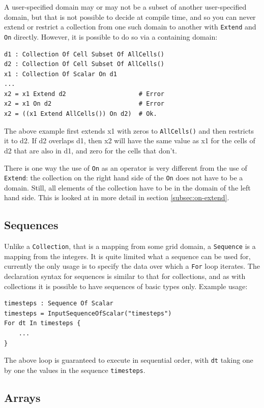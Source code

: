 \documentclass[11pt]{article}
\newcommand{\code}[1]{\texttt{#1}}
\begin{document}
A user-specified domain may or may not be a subset of another user-specified domain, but
that is not possible to decide at compile time, and so you can never extend or restrict a
collection from one such domain to another with \code{Extend} and \code{On}
directly. However, it is possible to do so via a containing domain:

\begin{verbatim}
d1 : Collection Of Cell Subset Of AllCells()
d2 : Collection Of Cell Subset Of AllCells()
x1 : Collection Of Scalar On d1
...
x2 = x1 Extend d2                    # Error
x2 = x1 On d2                        # Error
x2 = ((x1 Extend AllCells()) On d2)  # Ok.
\end{verbatim}

The above example first extends x1 with zeros to \code{AllCells()} and then restricts it
to d2. If d2 overlaps d1, then x2 will have the same value as x1 for the cells of d2 that
are also in d1, and zero for the cells that don't.

There is one way the use of \code{On} as an operator is very different from the use of
\code{Extend}: the collection on the right hand side of the \code{On} does not have to be
a domain. Still, all elements of the collection have to be in the domain of the left hand
side. This is looked at in more detail in section \ref{subsec:on-extend}.

\subsection{Sequences}

Unlike a \code{Collection}, that is a mapping from some grid domain, a \code{Sequence} is
a mapping from the integers. It is quite limited what a sequence can be used for,
currently the only usage is to specify the data over which a \code{For} loop iterates. The
declaration syntax for sequences is similar to that for collections, and as with
collections it is possible to have sequences of basic types only. Example usage:
\begin{verbatim}
timesteps : Sequence Of Scalar
timesteps = InputSequenceOfScalar("timesteps")
For dt In timesteps {
    ...
}
\end{verbatim}

The above loop is guaranteed to execute in sequential order, with \code{dt} taking one by
one the values in the sequence \code{timesteps}.

\subsection{Arrays}
\end{document}
